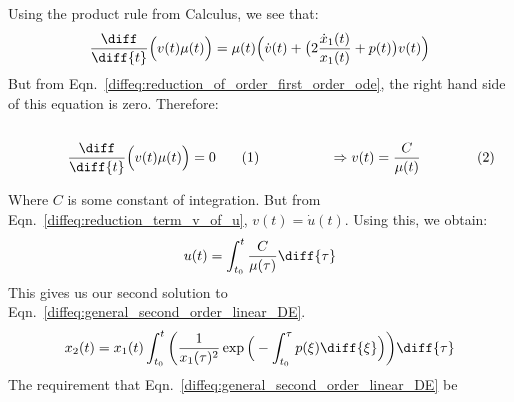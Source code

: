             Using the product rule from Calculus, we see that:
            \begin{equation}
                \frac{\diff}{\diff{t}}\Big(v(t)\mu(t)\Big)
                =\mu(t)\Big(\dot{v}(t)+
                \big(2\frac{\dot{x}_{1}(t)}{x_{1}(t)}+p(t)\big)v(t)\Big)
            \end{equation}
            But from Eqn.~\ref{diffeq:reduction_of_order_first_order_ode},
            the right hand side of this equation is zero. Therefore:
            \par
            \begin{subequations}
                \begin{minipage}[b]{0.49\textwidth}
                    \centering
                    \begin{equation}
                        \frac{\diff}{\diff{t}}\Big(v(t)\mu(t)\Big)=0
                    \end{equation}
                \end{minipage}
                \hfill
                \begin{minipage}[b]{0.49\textwidth}
                    \centering
                    \begin{equation}
                        \Rightarrow
                        v(t)=\frac{C}{\mu(t)}
                    \end{equation}
                \end{minipage}
            \end{subequations}
            \par\hfill\par
            Where $C$ is some constant of integration. But from
            Eqn.~\ref{diffeq:reduction_term_v_of_u},
            $v(t)=\dot{u}(t)$. Using this, we obtain:
            \begin{equation}
                u(t)=\int_{t_{0}}^{t}\frac{C}{\mu(\tau)}\diff{\tau}
            \end{equation}
            This gives us our second solution to
            Eqn.~\ref{diffeq:general_second_order_linear_DE}.
            \begin{equation}
                x_{2}(t)=
                x_{1}(t)\int_{t_{0}}^{t}\bigg(
                    \frac{1}{x_{1}(\tau)^{2}}
                    \exp\Big(-\int_{t_{0}}^{\tau}p(\xi)\diff{\xi}\Big)
                \bigg)\diff{\tau}
            \end{equation}
            The requirement that
            Eqn.~\ref{diffeq:general_second_order_linear_DE} be
